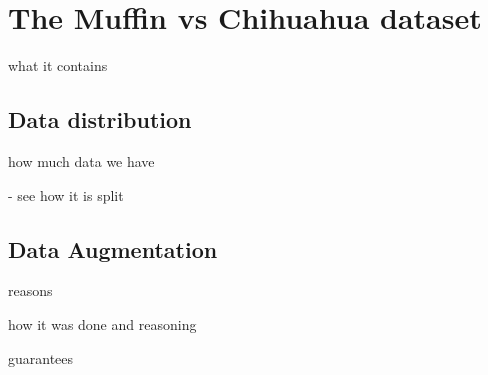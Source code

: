\section{The Muffin vs Chihuahua dataset}

what it contains
\subsection{Data distribution}
how much data we have

- see how it is split


\subsection{Data Augmentation}
reasons

how it was done and reasoning

guarantees